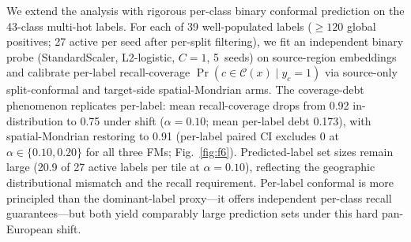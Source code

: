 \documentclass[11pt]{article}
\begin{document}
We extend the analysis with rigorous per-class binary conformal
prediction on the 43-class multi-hot labels. For each of 39 well-populated labels ($\ge120$ global
positives; 27 active per seed after per-split filtering), we fit an independent binary probe
(StandardScaler, L2-logistic, $C=1$, 5~seeds) on source-region embeddings and calibrate per-label
recall-coverage $\Pr(c\in\mathcal{C}(x)\mid y_c=1)$ via source-only split-conformal and target-side
spatial-Mondrian arms. The coverage-debt phenomenon replicates per-label: mean recall-coverage drops from
0.92 in-distribution to 0.75 under shift ($\alpha=0.10$; mean per-label debt
0.173), with spatial-Mondrian restoring to 0.91 (per-label paired CI excludes $0$ at
$\alpha\in\{0.10,0.20\}$ for all three FMs; Fig.~\ref{fig:f6}). Predicted-label set sizes remain large
(20.9 of 27 active labels per tile at $\alpha=0.10$), reflecting the geographic
distributional mismatch and the recall requirement. Per-label conformal is more principled than the
dominant-label proxy---it offers independent per-class recall guarantees---but both yield comparably large
prediction sets under this hard pan-European shift.
\end{document}
